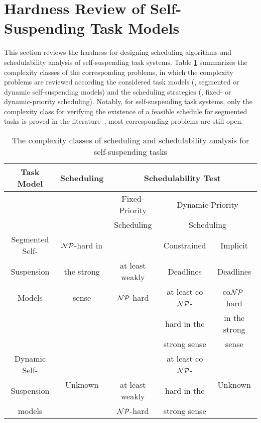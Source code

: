 \section{Hardness Review of Self-Suspending Task Models}
This section reviews the hardness for designing scheduling algorithms and schedulability analysis of self-suspending task systems. Table \ref{table:complexity} summarizes the complexity classes of the corresponding problems, in which the complexity problems are reviewed according the considered task models (\ie, segmented or dynamic self-suspending models) and the scheduling strategies (\ie, fixed- or dynamic-priority scheduling). Notably, for self-suspending task systems, only the complexity class for verifying the existence of a feasible schedule for segmented tasks is proved in the literature~\cite{Ridouard_2004}, most corresponding problems are still open.

\begin{table}
\centering
    \begin{tabular}{|*5{c|}}
 \hline
    Task Model & Scheduling & \multicolumn{3}{c|}{Schedulability Test} \\
    \hline
    &  & Fixed-Priority & \multicolumn{2}{c|}{Dynamic-Priority}\\
    &  & Scheduling     & \multicolumn{2}{c|}{Scheduling}\\
    \cline{3-5}    
    Segmented Self- & ${\cal NP}$-hard in &  & Constrained & Implicit\\
    Suspension  & the strong & at least weakly   & Deadlines   & Deadlines \\
    \cline{4-5}
    Models & sense \cite{Ridouard_2004} & ${\cal NP}$-hard & at least co${\cal NP}$- & co${\cal NP}$-hard \\
    &  & & hard in the & in the strong\\
    & & & strong sense & sense\\
    \hline
    Dynamic Self- & \multirow{3}{*}{Unknown} & & at least co${\cal NP}$- & \multirow{3}{*}{Unknown}\\
    Suspension & & at least weakly &hard in the & \\
    models & & ${\cal NP}$-hard & strong sense & \\
    \hline
    \end{tabular}
    \caption{The complexity classes of scheduling and schedulability analysis for self-suspending tasks}
    \label{table:complexity}
\end{table}

